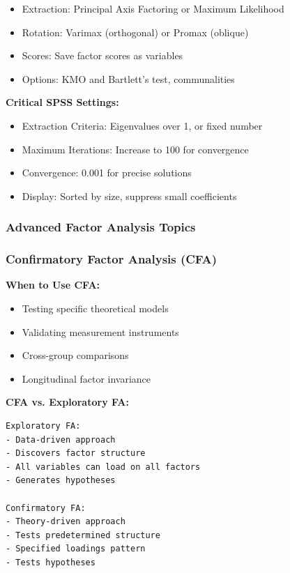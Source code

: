 \documentclass[
]{article}
\begin{document}
\begin{itemize}
\item
  Extraction: Principal Axis Factoring or Maximum Likelihood
\item
  Rotation: Varimax (orthogonal) or Promax (oblique)
\item
  Scores: Save factor scores as variables
\item
  Options: KMO and Bartlett's test, communalities
\end{itemize}

\textbf{Critical SPSS Settings:}

\begin{itemize}
\item
  Extraction Criteria: Eigenvalues over 1, or fixed number
\item
  Maximum Iterations: Increase to 100 for convergence
\item
  Convergence: 0.001 for precise solutions
\item
  Display: Sorted by size, suppress small coefficients
\end{itemize}

\subsubsection{Advanced Factor Analysis Topics}

\subsubsection{Confirmatory Factor Analysis (CFA)}

\textbf{When to Use CFA:}

\begin{itemize}
\item
  Testing specific theoretical models
\item
  Validating measurement instruments
\item
  Cross-group comparisons
\item
  Longitudinal factor invariance
\end{itemize}

\textbf{CFA vs. Exploratory FA:}

\begin{verbatim}
Exploratory FA:
- Data-driven approach
- Discovers factor structure
- All variables can load on all factors
- Generates hypotheses

Confirmatory FA:
- Theory-driven approach
- Tests predetermined structure
- Specified loadings pattern
- Tests hypotheses
\end{verbatim}
\end{document}
